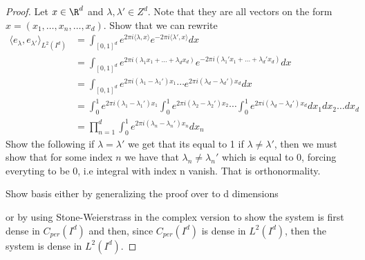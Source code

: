\begin{proof}
    Let $x\in \R^d$ and $\lambda, \lambda' \in Z^d$. Note that they are all vectors on the form $x=(x_1,\dots, x_n, \dots, x_d)$.
    Show that we can rewrite 
    \begin{align*}
        \langle e_{\lambda},e_{\lambda'} \rangle_{L^2(I^d)} &= \int_{[0,1]^d} e^{2\pi i \langle\lambda, x\rangle} e^{-2 \pi i \langle \lambda', x\rangle} dx \\
        &= \int_{[0,1]^d} e^{2\pi i  (\lambda_1x_1 + \dots +\lambda_d x_d)} e^{-2\pi i  (\lambda_1' x_1 + \dots +\lambda_d' x_d)} dx\\
        &= \int_{[0,1]^d} e^{2\pi i  (\lambda_1 -\lambda_1')x_1} \cdots e^{2\pi i  (\lambda_d -\lambda_d')x_d} dx\\
        &= \int_0^1 e^{2\pi i  (\lambda_1- \lambda_1')x_1} \int_0^1 e^{2\pi i  (\lambda_2 - \lambda_2')x_2}  \cdots \int_0^1 e^{2\pi i  (\lambda_d - \lambda_d')x_d} dx_1 dx_2 \dots dx_d \\
        &=\prod_{n=1}^d \int_0^1 e^{2\pi i  (\lambda_n- \lambda_n')x_n} d x_n 
    \end{align*}
    Show the following 
    if $\lambda = \lambda'$ we get that its equal to 1
    if $\lambda \neq \lambda'$, then we must show that for some index $n$ we have that $\lambda_n \neq \lambda_n'$ which is equal to 0, forcing everyting to be 0, i.e integral with index n vanish.
    That is orthonormality.

    Show basis either by generalizing the proof over to d dimensions
    
    or by using Stone-Weierstrass in the complex version to show the system is first dense in $C_{per}(I^d)$
    and then, since $C_{per}(I^d)$ is dense in $L^2(I^d)$, then the system is dense in $L^2(I^d)$. 
\end{proof}